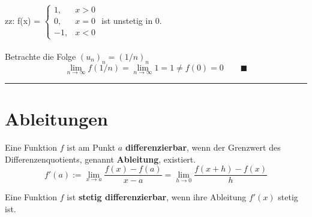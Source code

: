 \documentclass{article}
\begin{document}
\begin{itemize}
\begin{minipage}{\textwidth}
{		\\
		zz: f(x) = $\begin{cases}1, & x > 0\\ 0, & x = 0\\ -1, & x < 0\end{cases}$ \quad ist unstetig in $0$.\\
		\\
		Betrachte die Folge $(u_n)_n = (1/n)_n$
			$$\lim\limits_{n\rightarrow \infty} f(1/n) = \lim\limits_{n\rightarrow \infty} 1 = 1 \neq f(0) = 0 \qquad\blacksquare$$
	\hrule
	}
	\end{minipage}
\end{itemize}


\newpage


\section{Ableitungen}
Eine Funktion $f$ ist am Punkt $a$ \textbf{differenzierbar}, wenn der Grenzwert des Differenzenquotients, genannt \textbf{Ableitung}, existiert.
	\begin{equation}
		f'(a) := \lim\limits_{x\rightarrow a} \frac{f(x) - f(a)}{x - a} = \lim\limits_{h\rightarrow 0} \frac{ f(x+h) - f(x) }{h}
	\end{equation}

Eine Funktion $f$ ist \textbf{stetig differenzierbar}, wenn ihre Ableitung $f'(x)$ stetig ist.

\vspace{0.5cm}
\end{document}
